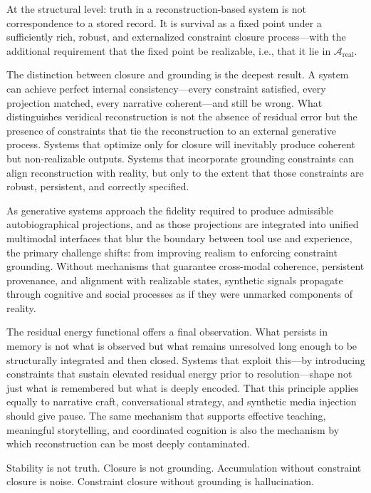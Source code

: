 \documentclass[12pt, letterpaper]{article}
\theoremstyle{flyxion}
\begin{document}
At the structural level: truth in a reconstruction-based system is not correspondence to a stored record. It is survival as a fixed point under a sufficiently rich, robust, and externalized constraint closure process---with the additional requirement that the fixed point be realizable, i.e., that it lie in $\mathcal{A}_\mathrm{real}$.

The distinction between closure and grounding is the deepest result. A system can achieve perfect internal consistency---every constraint satisfied, every projection matched, every narrative coherent---and still be wrong. What distinguishes veridical reconstruction is not the absence of residual error but the presence of constraints that tie the reconstruction to an external generative process. Systems that optimize only for closure will inevitably produce coherent but non-realizable outputs. Systems that incorporate grounding constraints can align reconstruction with reality, but only to the extent that those constraints are robust, persistent, and correctly specified.

As generative systems approach the fidelity required to produce admissible autobiographical projections, and as those projections are integrated into unified multimodal interfaces that blur the boundary between tool use and experience, the primary challenge shifts: from improving realism to enforcing constraint grounding. Without mechanisms that guarantee cross-modal coherence, persistent provenance, and alignment with realizable states, synthetic signals propagate through cognitive and social processes as if they were unmarked components of reality.

The residual energy functional offers a final observation. What persists in memory is not what is observed but what remains unresolved long enough to be structurally integrated and then closed. Systems that exploit this---by introducing constraints that sustain elevated residual energy prior to resolution---shape not just what is remembered but what is deeply encoded. That this principle applies equally to narrative craft, conversational strategy, and synthetic media injection should give pause. The same mechanism that supports effective teaching, meaningful storytelling, and coordinated cognition is also the mechanism by which reconstruction can be most deeply contaminated.

Stability is not truth. Closure is not grounding. Accumulation without constraint closure is noise. Constraint closure without grounding is hallucination.
\end{document}

